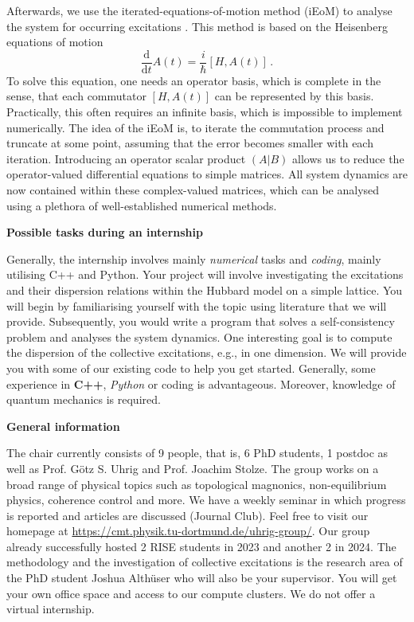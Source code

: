 \documentclass{article}
\newcommand{\msection}[1]{ { \vspace{5mm} \hspace{-6mm} \large \textbf{#1}} \vspace{2mm} } %
\newcommand{\timeDeriv}{\frac{\mathrm{d}}{\mathrm{d}t}}
\begin{document}
Afterwards, we use the iterated-equations-of-motion method (iEoM) to analyse the system for occurring excitations \cite{althueser2024,philip18}.
This method is based on the Heisenberg equations of motion 
\begin{equation}
    \timeDeriv A(t) = \frac{i}{\hbar} [H, A(t)]\,.
\end{equation}
To solve this equation, one needs an operator basis, which is complete in the sense, that each commutator $[H, A(t)]$ can be represented by this basis.
Practically, this often requires an infinite basis, which is impossible to implement numerically.
The idea of the iEoM is, to iterate the commutation process and truncate at some point, assuming that the error becomes smaller with each iteration.
Introducing an operator scalar product $(A | B)$ allows us to reduce the operator-valued differential equations to simple matrices.
All system dynamics are now contained within these complex-valued matrices, which can be analysed using a plethora of well-established numerical methods.

\msection{Possible tasks during an internship}

Generally, the internship involves mainly \emph{numerical} tasks and \emph{coding}, mainly utilising C++ and Python.
Your project will involve investigating the excitations and their dispersion relations within the Hubbard model on a simple lattice.
You will begin by familiarising yourself with the topic using literature that we will provide.
Subsequently, you would write a program that solves a self-consistency problem and analyses the system dynamics.
One interesting goal is to compute the dispersion of the collective excitations, e.g., in one dimension.
We will provide you with some of our existing code to help you get started.
Generally, some experience in \textbf{C++}, \emph{Python} or coding is advantageous. Moreover, knowledge of quantum mechanics is required.


\msection{General information}

The chair currently consists of 9 people, that is, 6 PhD students, 1 postdoc as well as Prof. G\"otz S. Uhrig and Prof. Joachim Stolze. 
The group works on a broad range of physical topics such as topological magnonics, non-equilibrium physics, coherence control and more. 
We have a weekly seminar in which progress is reported and articles are discussed (Journal Club). Feel free to visit our homepage at \url{https://cmt.physik.tu-dortmund.de/uhrig-group/}. 
Our group already successfully hosted 2 RISE students in 2023 and another 2 in 2024.
The methodology and the investigation of collective excitations is the research area of the PhD student Joshua Alth\"user who will also be your supervisor.
You will get your own office space and access to our compute clusters. We do not offer a virtual internship.


 
\end{document}
